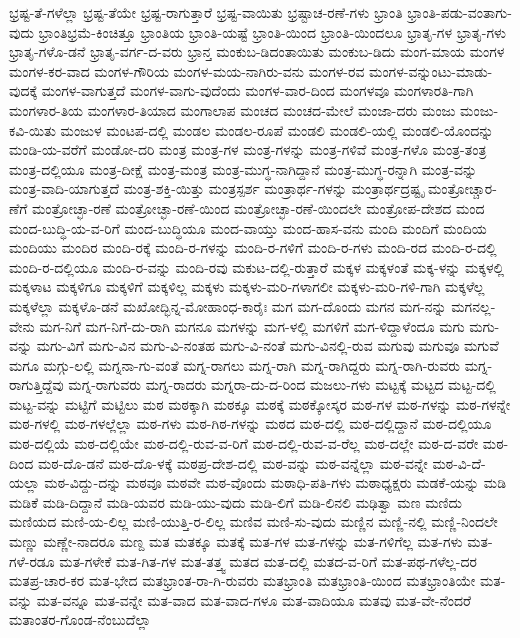 {ಭ್ರಷ್ಟ-ತೆ-ಗಳೆಲ್ಲಾ
ಭ್ರಷ್ಟ-ತೆಯೇ
ಭ್ರಷ್ಟ-ರಾಗುತ್ತಾರೆ
ಭ್ರಷ್ಟ-ವಾಯಿತು
ಭ್ರಷ್ಟಾಚ-ರಣೆ-ಗಳು
ಭ್ರಾಂತಿ
ಭ್ರಾಂತಿ-ಪಡು-ವಂತಾಗು-ವುದು
ಭ್ರಾಂತಿಭ್ರಮೆ-ಕಿಂಚಿತ್ತೂ
ಭ್ರಾಂತಿಯ
ಭ್ರಾಂತಿ-ಯಷ್ಟೆ
ಭ್ರಾಂತಿ-ಯಿಂದ
ಭ್ರಾಂತಿ-ಯಿಂದಲೂ
ಭ್ರಾತೃ-ಗಳ
ಭ್ರಾತೃ-ಗಳು
ಭ್ರಾತೃ-ಗಳೊ-ಡನೆ
ಭ್ರಾತೃ-ವರ್ಗ-ದ-ವರು
ಭ್ರಾನ್ತ
ಮಂಕುಬ-ಡಿದಂತಾಯಿತು
ಮಂಕುಬ-ಡಿದು
ಮಂಗ-ಮಾಯ
ಮಂಗಳ
ಮಂಗಳ-ಕರ-ವಾದ
ಮಂಗಳ-ಗೌರಿಯ
ಮಂಗಳ-ಮಯ-ನಾಗಿರು-ವನು
ಮಂಗಳ-ರವ
ಮಂಗಳ-ವನ್ನುಂಟು-ಮಾಡು-ವುದಕ್ಕೆ
ಮಂಗಳ-ವಾಗುತ್ತದೆ
ಮಂಗಳ-ವಾಗು-ವುದೆಂದು
ಮಂಗಳ-ವಾರ-ದಿಂದ
ಮಂಗಳವೂ
ಮಂಗಳಾರತಿ-ಗಾಗಿ
ಮಂಗಳಾರ-ತಿಯ
ಮಂಗಳಾರ-ತಿಯಾದ
ಮಂಗಾಲಾಪ
ಮಂಚದ
ಮಂಚದ-ಮೇಲೆ
ಮಂಜಾ-ದರು
ಮಂಜು
ಮಂಜು-ಕವಿ-ಯಿತು
ಮಂಜುಳ
ಮಂಟಪ-ದಲ್ಲಿ
ಮಂಡಲ
ಮಂಡಲ-ರೂಪೆ
ಮಂಡಲಿ
ಮಂಡಲಿ-ಯಲ್ಲಿ
ಮಂಡಲಿ-ಯೊಂದನ್ನು
ಮಂಡಿ-ಯ-ವರೆಗೆ
ಮಂಡೋ-ದರಿ
ಮಂತ್ರ
ಮಂತ್ರ-ಗಳ
ಮಂತ್ರ-ಗಳನ್ನು
ಮಂತ್ರ-ಗಳಿವೆ
ಮಂತ್ರ-ಗಳೊ
ಮಂತ್ರ-ತಂತ್ರ
ಮಂತ್ರ-ದಲ್ಲಿಯೂ
ಮಂತ್ರ-ದೀಕ್ಷೆ
ಮಂತ್ರ-ಮಂತ್ರ
ಮಂತ್ರ-ಮುಗ್ಧ-ನಾಗಿದ್ದಾನೆ
ಮಂತ್ರ-ಮುಗ್ಧ-ರನ್ನಾಗಿ
ಮಂತ್ರ-ವನ್ನು
ಮಂತ್ರ-ವಾದಿ-ಯಾಗುತ್ತದೆ
ಮಂತ್ರ-ಶಕ್ತಿ-ಯಿತ್ತು
ಮಂತ್ರಸ್ಪರ್ಶ
ಮಂತ್ರಾರ್ಥ-ಗಳನ್ನು
ಮಂತ್ರಾರ್ಥದ್ರಷ್ಟೃ
ಮಂತ್ರೋಚ್ಚಾರ-ಣೆಗೆ
ಮಂತ್ರೋಚ್ಛಾ-ರಣೆ
ಮಂತ್ರೋಚ್ಛಾ-ರಣೆ-ಯಿಂದ
ಮಂತ್ರೋಚ್ಛಾ-ರಣೆ-ಯಿಂದಲೇ
ಮಂತ್ರೋಪ-ದೇಶದ
ಮಂದ
ಮಂದ-ಬುದ್ಧಿ-ಯ-ವ-ರಿಗೆ
ಮಂದ-ಬುದ್ಧಿಯೂ
ಮಂದ-ವಾಯ್ತು
ಮಂದ-ಹಾಸ-ವನು
ಮಂದಿ
ಮಂದಿಗೆ
ಮಂದಿಯ
ಮಂದಿಯು
ಮಂದಿರ
ಮಂದಿ-ರಕ್ಕೆ
ಮಂದಿ-ರ-ಗಳನ್ನು
ಮಂದಿ-ರ-ಗಳಿಗೆ
ಮಂದಿ-ರ-ಗಳು
ಮಂದಿ-ರದ
ಮಂದಿ-ರ-ದಲ್ಲಿ
ಮಂದಿ-ರ-ದಲ್ಲಿಯೂ
ಮಂದಿ-ರ-ವನ್ನು
ಮಂದಿ-ರವು
ಮಕುಟ-ದಲ್ಲಿ-ರುತ್ತಾರೆ
ಮಕ್ಕಳ
ಮಕ್ಕಳಂತೆ
ಮಕ್ಕ-ಳನ್ನು
ಮಕ್ಕಳಲ್ಲಿ
ಮಕ್ಕಳಾಟ
ಮಕ್ಕಳಿಗೂ
ಮಕ್ಕಳಿಗೆ
ಮಕ್ಕಳಿಲ್ಲ
ಮಕ್ಕಳು
ಮಕ್ಕಳು-ಮರಿ-ಗಳಾಗಲೀ
ಮಕ್ಕಳು-ಮರಿ-ಗಳಿ-ಗಾಗಿ
ಮಕ್ಕಳೆಲ್ಲ
ಮಕ್ಕಳೆಲ್ಲಾ
ಮಕ್ಕಳೊ-ಡನೆ
ಮಖೋದ್ಭಿನ್ನ-ಮೋಹಾಂಧ-ಕಾರೈಃ
ಮಗ
ಮಗ-ದೊಂದು
ಮಗನ
ಮಗ-ನನ್ನು
ಮಗನಲ್ಲ-ವೇನು
ಮಗ-ನಿಗೆ
ಮಗ-ನಿಗೆ-ದು-ರಾಗಿ
ಮಗನೂ
ಮಗಳನ್ನು
ಮಗ-ಳಲ್ಲಿ
ಮಗಳಿಗೆ
ಮಗ-ಳಿದ್ದಾಳೆಂದೂ
ಮಗು
ಮಗು-ವನ್ನು
ಮಗು-ವಿಗೆ
ಮಗು-ವಿನ
ಮಗು-ವಿ-ನಂತಹ
ಮಗು-ವಿ-ನಂತೆ
ಮಗು-ವಿನಲ್ಲಿ-ರುವ
ಮಗುವು
ಮಗುವೂ
ಮಗುವೆ
ಮಗೂ
ಮಗ್ಗು-ಲಲ್ಲಿ
ಮಗ್ನನಾ-ಗು-ವಂತೆ
ಮಗ್ನ-ರಾಗಲು
ಮಗ್ನ-ರಾಗಿ
ಮಗ್ನ-ರಾಗಿದ್ದರು
ಮಗ್ನ-ರಾಗಿ-ರುವರು
ಮಗ್ನ-ರಾಗುತ್ತಿದ್ದೆವು
ಮಗ್ನ-ರಾಗುವರು
ಮಗ್ನ-ರಾದರು
ಮಗ್ನರಾ-ದು-ದ-ರಿಂದ
ಮಜಲು-ಗಳು
ಮಟ್ಟಕ್ಕೆ
ಮಟ್ಟದ
ಮಟ್ಟ-ದಲ್ಲಿ
ಮಟ್ಟ-ವನ್ನು
ಮಟ್ಟಿಗೆ
ಮಟ್ಟಿಲು
ಮಠ
ಮಠಕ್ಕಾಗಿ
ಮಠಕ್ಕೂ
ಮಠಕ್ಕೆ
ಮಠಕ್ಕೋಸ್ಕರ
ಮಠ-ಗಳ
ಮಠ-ಗಳನ್ನು
ಮಠ-ಗಳನ್ನೇ
ಮಠ-ಗಳಲ್ಲಿ
ಮಠ-ಗಳಲ್ಲೆಲ್ಲಾ
ಮಠ-ಗಳು
ಮಠ-ಗಿಠ-ಗಳನ್ನು
ಮಠದ
ಮಠ-ದಲ್ಲಿ
ಮಠ-ದಲ್ಲಿದ್ದಾನೆ
ಮಠ-ದಲ್ಲಿಯೂ
ಮಠ-ದಲ್ಲಿಯೆ
ಮಠ-ದಲ್ಲಿಯೇ
ಮಠ-ದಲ್ಲಿ-ರುವ-ವ-ರಿಗೆ
ಮಠ-ದಲ್ಲಿ-ರುವ-ವ-ರೆಲ್ಲ
ಮಠ-ದಲ್ಲೇ
ಮಠ-ದ-ವರೇ
ಮಠ-ದಿಂದ
ಮಠ-ದೊ-ಡನೆ
ಮಠ-ದೊ-ಳಕ್ಕೆ
ಮಠಪ್ರ-ದೇಶ-ದಲ್ಲಿ
ಮಠ-ವನ್ನು
ಮಠ-ವನ್ನೆಲ್ಲಾ
ಮಠ-ವನ್ನೇ
ಮಠ-ವಿ-ದೆ-ಯಲ್ಲಾ
ಮಠ-ವಿದ್ದು-ದನ್ನು
ಮಠವೂ
ಮಠವೇ
ಮಠ-ವೊಂದು
ಮಠಾಧಿ-ಪತಿ-ಗಳು
ಮಠಾಧ್ಯಕ್ಷರು
ಮಡಕೆ-ಯನ್ನು
ಮಡಿ
ಮಡಿಕೆ
ಮಡಿ-ದಿದ್ದಾನೆ
ಮಡಿ-ಯವರ
ಮಡಿ-ಯು-ವುದು
ಮಡಿ-ಲಿಗೆ
ಮಡಿ-ಲಿನಲಿ
ಮಢಿತ್ವಾ
ಮಣ
ಮಣಿದು
ಮಣಿಯದ
ಮಣಿ-ಯ-ಲಿಲ್ಲ
ಮಣಿ-ಯುತ್ತಿ-ರ-ಲಿಲ್ಲ
ಮಣಿವ
ಮಣಿ-ಸು-ವುದು
ಮಣ್ಣಿನ
ಮಣ್ಣಿ-ನಲ್ಲಿ
ಮಣ್ಣಿ-ನಿಂದಲೇ
ಮಣ್ಣು
ಮಣ್ಣೇ-ನಾದರೂ
ಮಣ್ದ
ಮತ
ಮತಕ್ಕೂ
ಮತಕ್ಕೆ
ಮತ-ಗಳ
ಮತ-ಗಳನ್ನು
ಮತ-ಗಳಿಗೆಲ್ಲ
ಮತ-ಗಳು
ಮತ-ಗಳೆ-ರಡೂ
ಮತ-ಗಳೇಕೆ
ಮತ-ಗಿತ-ಗಳ
ಮತ-ತತ್ತ್ವ
ಮತದ
ಮತ-ದಲ್ಲಿ
ಮತದ-ವ-ರಿಗೆ
ಮತ-ಪಥ-ಗಳೆಲ್ಲ-ದರ
ಮತಪ್ರ-ಚಾರ-ಕರ
ಮತ-ಭೇದ
ಮತಭ್ರಾಂತ-ರಾ-ಗಿ-ರುವರು
ಮತಭ್ರಾಂತಿ
ಮತಭ್ರಾಂತಿ-ಯಿಂದ
ಮತಭ್ರಾಂತಿಯೇ
ಮತ-ವನ್ನು
ಮತ-ವನ್ನೂ
ಮತ-ವನ್ನೇ
ಮತ-ವಾದ
ಮತ-ವಾದ-ಗಳೂ
ಮತ-ವಾದಿಯೂ
ಮತವು
ಮತ-ವೇ-ನೆಂದರೆ
ಮತಾಂತರ-ಗೊಂಡ-ನೆಂಬುದೆಲ್ಲಾ
}

